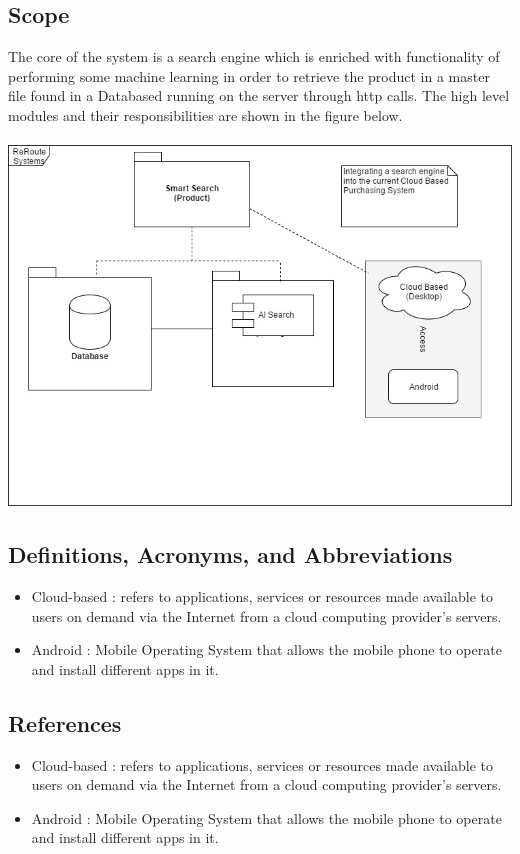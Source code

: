 \documentclass[a4paper,10pt]{article}
\begin{document}
	\subsection{Scope} 
	The core of the system is a search engine which is enriched with functionality
of performing some machine learning in order to retrieve the product in a master file found in a Databased running on the server through http calls. The high level modules and their responsibilities are shown in the figure below. \\ \\
	\includegraphics[scale=0.62]{scope1.jpg}
	\subsection{Definitions, Acronyms, and Abbreviations} 

	\begin{itemize} 
	\item Cloud-based : refers to applications, services or resources made available to users on demand via the Internet from a cloud computing provider's servers.
	\item Android : Mobile Operating System that allows the mobile phone to operate and install different apps in it.
	\end{itemize}
	\subsection{References} 
	\begin{itemize} 
	\item Cloud-based : refers to applications, services or resources made available to users on demand via the Internet from a cloud computing provider's servers.
	\item Android : Mobile Operating System that allows the mobile phone to operate and install different apps in it.
	\end{itemize}
\end{document}
